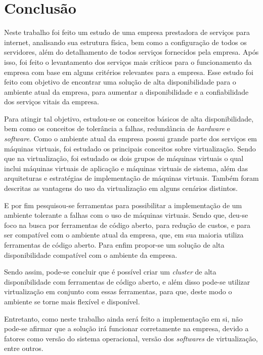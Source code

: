 \chapter{Conclusão}
\label{cap:conclusao}

Neste trabalho foi feito um estudo de uma empresa prestadora de serviços para internet, analisando sua estrutura física, bem como a configuração
de todos os servidores, além do detalhamento de todos serviços fornecidos pela empresa. Após isso, foi feito o levantamento dos serviços mais 
críticos para o funcionamento da empresa com base em alguns critérios relevantes para a empresa. Esse estudo foi feito com objetivo de encontrar 
uma solução de alta disponibilidade para o ambiente atual da empresa, para aumentar a disponibilidade e a confiabilidade dos serviços vitais da 
empresa.

Para atingir tal objetivo, estudou-se os conceitos básicos de alta disponibilidade, bem como os conceitos de tolerância a falhas, redundância de
\textit{hardware} e \textit{software}. Como o ambiente atual da empresa possui grande parte dos serviços em máquinas virtuais, foi estudado
os principais conceitos sobre virtualização. Sendo que na virtualização, foi estudado os dois grupos de máquinas virtuais o qual inclui máquinas 
virtuais de aplicação e máquinas virtuais de sistema, além das arquiteturas e estratégias de implementação de máquinas virtuais. Também foram 
descritas as vantagens do uso da virtualização em alguns cenários distintos.

E por fim pesquisou-se ferramentas para possibilitar a implementação de um ambiente tolerante a falhas com o uso de máquinas virtuais.
Sendo que, deu-se foco na busca por ferramentas de código aberto, para redução de custos, e para ser compatível com o ambiente atual da empresa,
que, em sua maioria utiliza ferramentas de código aberto. Para enfim propor-se um solução de alta disponibilidade compatível com o ambiente 
da empresa.

Sendo assim, pode-se concluir que é possível criar um \textit{cluster} de alta disponibilidade com ferramentas de código aberto, e além disso 
pode-se utilizar virtualização em conjunto com essas ferramentas, para que, deste modo o ambiente se torne mais flexível e disponível. 

Entretanto, como neste trabalho ainda será feito a implementação em si, não pode-se afirmar que a solução irá funcionar corretamente
na empresa, devido a fatores como versão do sistema operacional, versão dos \textit{softwares} de virtualização, entre outros.

